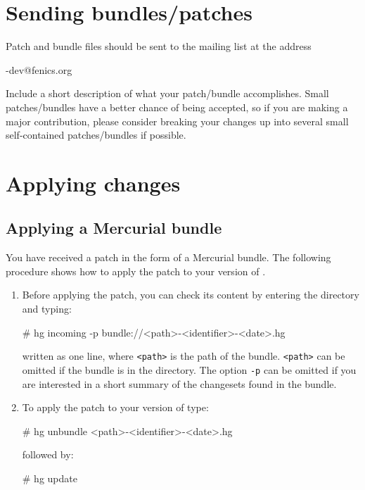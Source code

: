 \section{Sending bundles/patches}

Patch and bundle files should be sent to the \package{} mailing list at the address
\begin{macrocode}
\packagett{}-dev@fenics.org
\end{macrocode}
Include a short description of what your patch/bundle accomplishes. Small
patches/bundles have a better chance of being accepted, so if you are making a
major contribution, please consider breaking your changes up into
several small self-contained patches/bundles if possible.

\section{Applying changes}
\subsection{Applying a Mercurial bundle}

You have received a patch in the form of a Mercurial bundle. The following
procedure shows how to apply the patch to your version of \package{}.
\begin{enumerate}
\item Before applying the patch, you can check
  its content by entering the \package{} directory and typing:
  \begin{macrocode}
# hg incoming -p 
  bundle://<path>\packagett{}-<identifier>-<date>.hg
  \end{macrocode}
  written as one line, where \texttt{<path>} is the 
  path of the bundle. \texttt{<path>} 
  can be omitted if the bundle is in the \package{} directory. 
  The option \texttt{-p} can be omitted if you are interested in a 
  short summary of the changesets found in the bundle.
\item To apply the patch to your version of \package{} type:
  \begin{macrocode}
# hg unbundle <path>\packagett{}-<identifier>-<date>.hg
  \end{macrocode}
  followed by:
  \begin{macrocode}
  # hg update
  \end{macrocode}
\end{enumerate}

